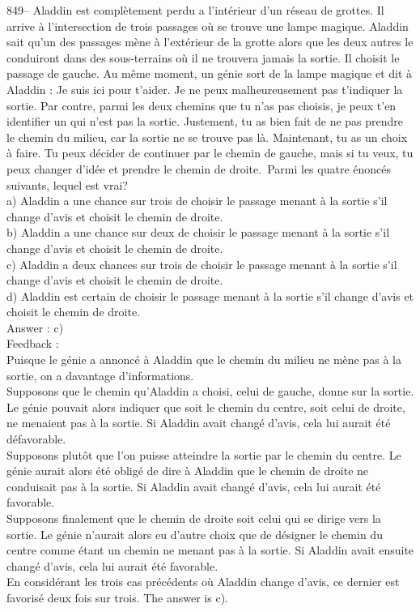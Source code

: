 \documentclass[letterpaper, 12pt]{article}
\begin{document}
849-- Aladdin est compl\`etement perdu a l'int\'erieur d'un r\'eseau
de grottes.  Il arrive \`a l'intersection de trois passages o\`u se
trouve une lampe magique.  Aladdin sait qu'un des passages m\`ene
\`a l'ext\'erieur de la grotte alors que les deux autres le
conduiront dans des sous-terrains o\`u il ne trouvera jamais la
sortie.  Il choisit le passage de gauche.  Au m\^eme moment, un
g\'enie sort de la lampe magique et dit \`a Aladdin : \og Je suis
ici pour t'aider.  Je ne peux malheureusement pas t'indiquer la
sortie.  Par contre, parmi les deux chemins que tu n'as pas choisis,
je peux t'en identifier un qui n'est pas la sortie.  Justement, tu
as bien fait de ne pas prendre le chemin du milieu, car la sortie ne
se trouve pas l\`a. Maintenant, tu as un choix \`a faire.  Tu peux
d\'ecider de continuer par le chemin de gauche, mais si tu veux, tu
peux changer d'id\'ee et prendre le chemin de droite.\fg\  Parmi les
quatre \'enonc\'es suivants, lequel est
vrai?\\
a) Aladdin a une chance sur trois de choisir le passage menant \`a la sortie
s'il change d'avis et choisit le chemin de droite. \\
b) Aladdin a une chance sur deux de choisir le passage menant \`a la sortie
s'il change d'avis et choisit le chemin de droite.\\
c) Aladdin a deux chances sur trois de choisir le passage menant \`a la
sortie s'il change d'avis et choisit le chemin de droite.\\
d) Aladdin est certain de choisir le passage menant \`a la sortie s'il
change d'avis et choisit le chemin de droite.\\

Answer : c)\\

Feedback : \\
Puisque le g\'enie a annonc\'e \`a Aladdin que le chemin du milieu ne m\`ene
pas \`a la sortie, on a davantage d'informations.\\
Supposons que le chemin qu'Aladdin a choisi, celui de gauche, donne
sur la sortie. Le g\'enie pouvait alors indiquer que soit le chemin
du centre, soit celui de droite, ne menaient pas \`a la sortie. Si
Aladdin avait chang\'e d'avis, cela lui aurait \'et\'e
d\'efavorable.\\
Supposons plut\^ot que l'on puisse atteindre la sortie par le chemin du
centre. Le g\'enie aurait alors \'et\'e oblig\'e de dire \`a Aladdin que le
chemin de droite ne conduisait pas \`a la sortie. Si Aladdin avait chang\'e
d'avis, cela lui aurait \'et\'e favorable.\\
Supposons finalement que le chemin de droite soit celui qui se dirige vers
la sortie. Le g\'enie n'aurait alors eu d'autre choix que de d\'esigner le
chemin du centre comme \'etant un chemin ne menant pas \`a la sortie. Si
Aladdin avait ensuite chang\'e d'avis, cela lui aurait \'et\'e favorable.\\
En consid\'erant les trois cas pr\'ec\'edents o\`u Aladdin change d'avis, ce
dernier est favoris\'e deux fois sur trois. The answer is c).\\
\end{document}
